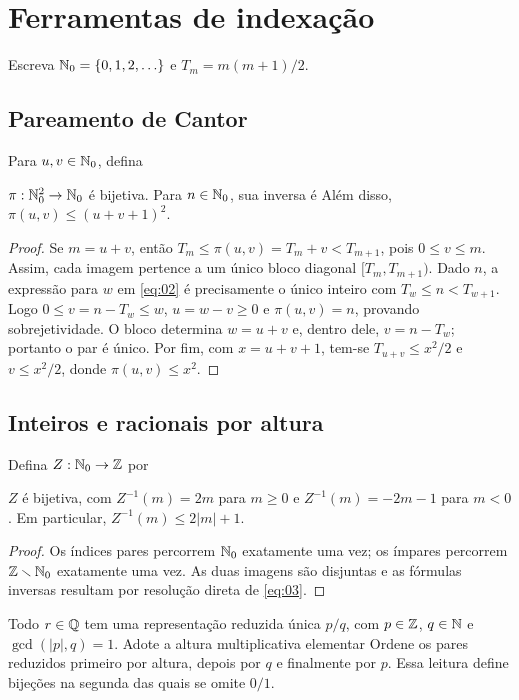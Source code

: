 \section{Ferramentas de indexação}
Escreva $\mathbb N_0=\{0,1,2,\ldots\}$ e $T_m=m(m+1)/2$.

\subsection{Pareamento de Cantor}
Para $u,v\in\mathbb N_0$, defina
\begin{lema}
$\pi:\mathbb N_0^2\to\mathbb N_0$ é bijetiva. Para $n\in\mathbb N_0$, sua inversa é
Além disso, $\pi(u,v)\le(u+v+1)^2$.
\end{lema}
\begin{proof}
Se $m=u+v$, então $T_m\le\pi(u,v)=T_m+v<T_{m+1}$, pois $0\le v\le m$. Assim, cada imagem pertence a um único bloco diagonal $[T_m,T_{m+1})$. Dado $n$, a expressão para $w$ em \eqref{eq:02} é precisamente o único inteiro com $T_w\le n<T_{w+1}$. Logo $0\le v=n-T_w\le w$, $u=w-v\ge0$ e $\pi(u,v)=n$, provando sobrejetividade. O bloco determina $w=u+v$ e, dentro dele, $v=n-T_w$; portanto o par é único. Por fim, com $x=u+v+1$, tem-se $T_{u+v}\le x^2/2$ e $v\le x^2/2$, donde $\pi(u,v)\le x^2$.
\end{proof}

\subsection{Inteiros e racionais por altura}
Defina $Z:\mathbb N_0\to\mathbb Z$ por
\begin{lema}
$Z$ é bijetiva, com $Z^{-1}(m)=2m$ para $m\ge0$ e $Z^{-1}(m)=-2m-1$ para $m<0$. Em particular, $Z^{-1}(m)\le2|m|+1$.
\end{lema}
\begin{proof}
Os índices pares percorrem $\mathbb N_0$ exatamente uma vez; os ímpares percorrem $\mathbb Z\smallsetminus\mathbb N_0$ exatamente uma vez. As duas imagens são disjuntas e as fórmulas inversas resultam por resolução direta de \eqref{eq:03}.
\end{proof}

Todo $r\in\mathbb Q$ tem uma representação reduzida única $p/q$, com $p\in\mathbb Z$, $q\in\mathbb N$ e $\gcd(|p|,q)=1$. Adote a altura multiplicativa elementar
Ordene os pares reduzidos primeiro por altura, depois por $q$ e finalmente por $p$. Essa leitura define bijeções
na segunda das quais se omite $0/1$.

